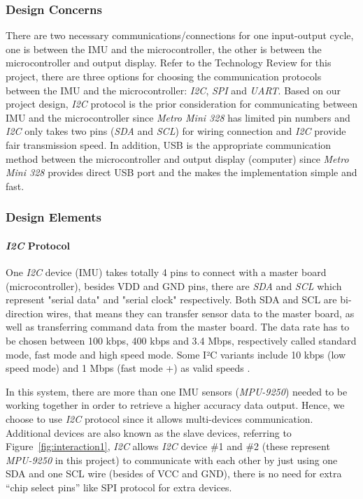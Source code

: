 	\subsubsection{Design Concerns}
	There are two necessary communications/connections for one input-output cycle, one is between the IMU and the microcontroller, the other is between the microcontroller and output display. Refer to the Technology Review for this project, there are three options for choosing the communication protocols between the IMU and the microcontroller: \textit{I2C}, \textit{SPI} and \textit{UART}. Based on our project design, \textit{I2C} protocol is the prior consideration for communicating between IMU and the microcontroller since \textit{Metro Mini 328} has limited pin numbers and \textit{I2C} only takes two pins (\textit{SDA} and \textit{SCL}) for wiring connection and \textit{I2C} provide fair transmission speed. In addition, USB is the appropriate communication method between the microcontroller and output display (computer) since \textit{Metro Mini 328} provides direct USB port and the makes the implementation simple and fast.\\ 

	\subsubsection{Design Elements}
		\paragraph{\textit{I2C} Protocol}
		One \textit{I2C} device (IMU) takes totally 4 pins to connect with a master board (microcontroller), besides VDD and GND pins, there are \textit{SDA} and \textit{SCL} which represent "serial data" and "serial clock" respectively. Both SDA and SCL are bi-direction wires, that means they can transfer sensor data to the master board, as well as transferring command data from the master board. The data rate has to be chosen between 100 kbps, 400 kbps and 3.4 Mbps, respectively called standard mode, fast mode and high speed mode. Some I²C variants include 10 kbps (low speed mode) and 1 Mbps (fast mode +) as valid speeds \cite{i2c-2}.

		In this system, there are more than one IMU sensors (\textit{MPU-9250}) needed to be working together in order to retrieve a higher accuracy data output. Hence, we choose to use \textit{I2C} protocol since it allows multi-devices communication. Additional devices are also known as the slave devices, referring to Figure~\ref{fig:interaction1}, \textit{I2C} allows \textit{I2C} device \#1 and \#2 (these represent \textit{MPU-9250} in this project) to communicate with each other by just using one SDA and one SCL wire (besides of VCC and GND), there is no need for extra “chip select pins” like SPI protocol for extra devices.\\

